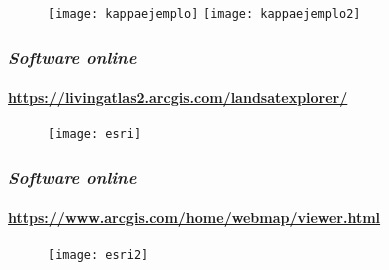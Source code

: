 \documentclass[14pt]{beamer}
\begin{document}
\begin{frame}
  \begin{figure}
    \centering
    \texttt{[image: kappaejemplo]}
  \texttt{[image: kappaejemplo2]}
  \end{figure}
\tiny{}
\end{frame}
\begin{frame}
\frametitle{\emph{Software online}}
\framesubtitle{\url{https://livingatlas2.arcgis.com/landsatexplorer/}}
  \begin{figure}
    \centering
    \texttt{[image: esri]}
  \end{figure}
\end{frame}
\begin{frame}
\frametitle{\emph{Software online}}
\framesubtitle{\url{https://www.arcgis.com/home/webmap/viewer.html}}
  \begin{figure}
    \centering
    \texttt{[image: esri2]}
  \end{figure}
\end{frame}
\end{document}
